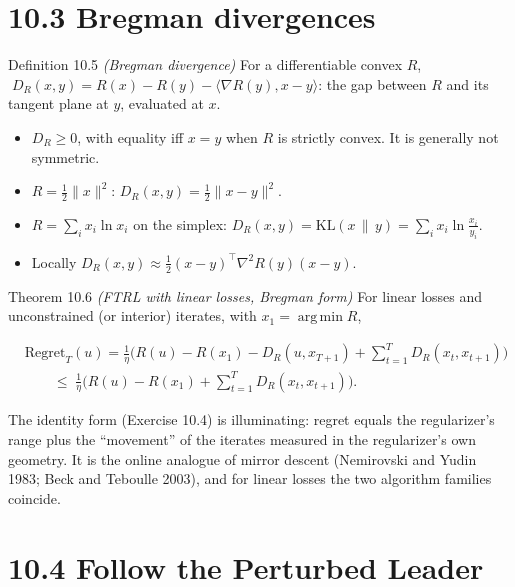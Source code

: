 \documentclass[11pt,a4paper,openany]{book}
\newcommand{\Reg}{\mathrm{Regret}}
\newcommand{\KL}{\mathrm{KL}}
\DeclareMathOperator*{\argmin}{arg\,min}
\newcommand{\ip}[2]{\langle #1,#2\rangle}
\newcommand{\norm}[1]{\lVert #1\rVert}
\begin{document}
\section*{10.3 Bregman divergences}\label{ch10-bregman}

\begin{bdef}{Definition 10.5 \emph{(Bregman divergence)}}
For a differentiable convex $R$, $\;D_R(x,y)=R(x)-R(y)-\ip{\nabla R(y)}{x-y}$: the gap between $R$ and its tangent plane at $y$, evaluated at $x$.
\end{bdef}

\begin{itemize}
\item $D_R\ge0$, with equality iff $x=y$ when $R$ is strictly convex. It is generally not symmetric.
\item $R=\frac12\norm x^2$: $D_R(x,y)=\frac12\norm{x-y}^2$.
\item $R=\sum_ix_i\ln x_i$ on the simplex: $D_R(x,y)=\KL(x\,\|\,y)=\sum_ix_i\ln\frac{x_i}{y_i}$.
\item Locally $D_R(x,y)\approx\frac12(x-y)^\top\nabla^2R(y)(x-y)$.
\end{itemize}

\begin{bthm}{Theorem 10.6 \emph{(FTRL with linear losses, Bregman form)}}
For linear losses and unconstrained (or interior) iterates, with $x_1=\argmin R$,

\[\begin{aligned}&\Reg_T(u)=\frac1\eta\Big(R(u)-R(x_1)-D_R(u,x_{T+1})+\sum_{t=1}^TD_R(x_t,x_{t+1})\Big)\\
&\qquad\le\;\frac1\eta\Big(R(u)-R(x_1)+\sum_{t=1}^TD_R(x_t,x_{t+1})\Big).\end{aligned}\]

\end{bthm}

The identity form (Exercise 10.4) is illuminating: regret equals the regularizer's range plus the ``movement'' of the iterates measured in the regularizer's own geometry. It is the online analogue of mirror descent (Nemirovski and Yudin 1983; Beck and Teboulle 2003), and for linear losses the two algorithm families coincide.

\section*{10.4 Follow the Perturbed Leader}\label{ch10-ftpl}
\end{document}
